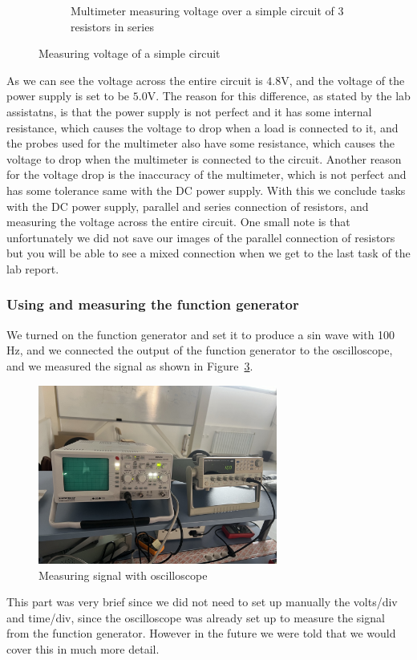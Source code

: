 \documentclass[a4paper, 10pt]{article}
\newcommand{\figref}[1]{Figure~\ref{#1}}
\begin{document}
\begin{figure}[h]
\begin{subfigure}[h]{0.65\textwidth}
								\caption{Multimeter measuring voltage over a simple circuit of 3 resistors in series}
								\label{sub-fig:MeasuringVoltageOfASimpleCircuit}
							\end{subfigure}

							\caption{Measuring voltage of a simple circuit}
							\label{fig:MeasuringVoltageOfACircuit}
					\end{figure}

					As we can see the voltage across the entire circuit is $4.8\text{V}$, and the voltage of the power supply is set to be $5.0\text{V}$. The reason for this difference, as stated by the
					lab assistatns, is that the power supply is not perfect and it has some internal resistance, which causes the voltage to drop when a load is connected to it, and the 
					probes used for the multimeter also have some resistance, which causes the voltage to drop when the multimeter is connected to the circuit. Another reason for the voltage drop is the
					inaccuracy of the multimeter, which is not perfect and has some tolerance same with the DC power supply. With this we conclude tasks with the DC power supply, parallel and series connection
					of resistors, and measuring the voltage across the entire circuit. One small note is that unfortunately we did not save our images of the parallel connection of resistors but you will be
					able to see a mixed connection when we get to the last task of the lab report.
				
				\subsubsection{Using and measuring the function generator}
					We turned on the function generator and set it to produce a sin wave with 100 Hz, and we connected the output of the function generator to the oscilloscope, and we measured the signal as shown in \figref{fig:MeasuringSignalWithOscilloscope}.
					\begin{figure}[h!]
						\centering
						\includegraphics[width=0.7\textwidth]{./images/MeasuringSignalWithOscilloscope.jpeg}
						\caption{Measuring signal with oscilloscope}
						\label{fig:MeasuringSignalWithOscilloscope}
					\end{figure}

					This part was very brief since we did not need to set up manually the volts/div and time/div, since the oscilloscope was already set up to measure the
					signal from the function generator. However in the future we were told that we would cover this in much more detail.

				
\end{document}
